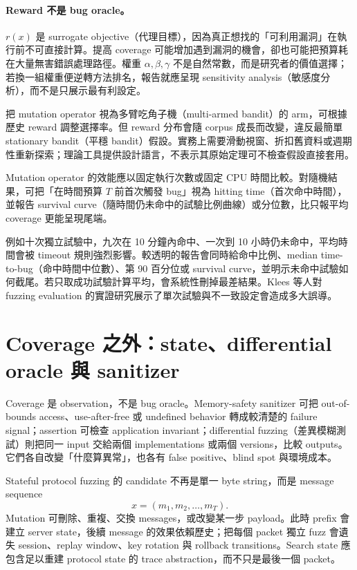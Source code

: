 \documentclass[11pt,a4paper,oneside,openany]{book}
\begin{document}
\paragraph{Reward 不是 bug oracle。}
$r(x)$ 是 surrogate objective（代理目標），因為真正想找的「可利用漏洞」在執行前不可直接計算。提高 coverage 可能增加遇到漏洞的機會，卻也可能把預算耗在大量無害錯誤處理路徑。權重 $\alpha,\beta,\gamma$ 不是自然常數，而是研究者的價值選擇；若換一組權重便逆轉方法排名，報告就應呈現 sensitivity analysis（敏感度分析），而不是只展示最有利設定。

把 mutation operator 視為多臂吃角子機（multi-armed bandit）的 arm，可根據歷史 reward 調整選擇率。但 reward 分布會隨 corpus 成長而改變，違反最簡單 stationary bandit（平穩 bandit）假設。實務上需要滑動視窗、折扣舊資料或週期性重新探索；理論工具提供設計語言，不表示其原始定理可不檢查假設直接套用。

Mutation operator 的效能應以固定執行次數或固定 CPU 時間比較。對隨機結果，可把「在時間預算 $T$ 前首次觸發 bug」視為 hitting time（首次命中時間），並報告 survival curve（隨時間仍未命中的試驗比例曲線）或分位數，比只報平均 coverage 更能呈現尾端。

例如十次獨立試驗中，九次在 10 分鐘內命中、一次到 10 小時仍未命中，平均時間會被 timeout 規則強烈影響。較透明的報告會同時給命中比例、median time-to-bug（命中時間中位數）、第 90 百分位或 survival curve，並明示未命中試驗如何截尾。若只取成功試驗計算平均，會系統性刪掉最差結果。Klees 等人對 fuzzing evaluation 的實證研究展示了單次試驗與不一致設定會造成多大誤導\cite{klees-fuzz-eval}。

\section{Coverage 之外：state、differential oracle 與 sanitizer}
Coverage 是 observation，不是 bug oracle。Memory-safety sanitizer 可把 out-of-bounds access、use-after-free 或 undefined behavior 轉成較清楚的 failure signal；assertion 可檢查 application invariant；differential fuzzing（差異模糊測試）則把同一 input 交給兩個 implementations 或兩個 versions，比較 outputs。它們各自改變「什麼算異常」，也各有 false positive、blind spot 與環境成本。

Stateful protocol fuzzing 的 candidate 不再是單一 byte string，而是 message sequence
\[
 x=(m_1,m_2,\ldots,m_T).
\]
Mutation 可刪除、重複、交換 messages，或改變某一步 payload。此時 prefix 會建立 server state，後續 message 的效果依賴歷史；把每個 packet 獨立 fuzz 會遺失 session、replay window、key rotation 與 rollback transitions。Search state 應包含足以重建 protocol state 的 trace abstraction，而不只是最後一個 packet。
\end{document}
